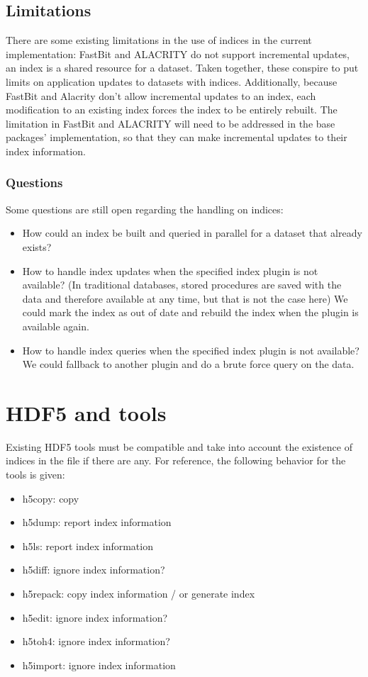 \documentclass[letterpaper,hyper]{THG_RFC}
\begin{document}
\subsection{Limitations}

There are some existing limitations in the use of indices in the current
implementation: FastBit and ALACRITY do not support incremental updates,
an index is a shared resource for a dataset. Taken together, these conspire to
put limits on application updates to datasets with indices.
Additionally, because FastBit and Alacrity don't allow incremental updates to
an index, each modification to an existing index forces the index to be entirely
rebuilt. The limitation in FastBit and ALACRITY will need to be addressed in
the base packages' implementation, so that they can make incremental updates
to their index information.

\subsubsection*{Questions}
Some questions are still open regarding the handling on indices:
\begin{itemize}
\item How could an index be built and queried in parallel for a dataset that already exists?
\item How to handle index updates when the specified index plugin is not available?
(In traditional databases, stored procedures are saved with the data and
therefore available at any time, but that is not the case here)
We could mark the index as out of date and rebuild the index when the plugin is
available again.
\item How to handle index queries when the specified index plugin is not
available? We could fallback to another plugin and do a brute force query on the data.
\end{itemize}

\section{HDF5 and tools}

Existing HDF5 tools must be compatible and take into account the existence of
indices in the file if there are any. For reference, the following behavior for
the tools is given:

\begin{itemize}
\item h5copy: copy
\item h5dump: report index information
\item h5ls: report index information
\item h5diff: ignore index information?
\item h5repack: copy index information / or generate index
\item h5edit: ignore index information?
\item h5toh4: ignore index information?
\item h5import: ignore index information
\end{itemize}
\end{document}
